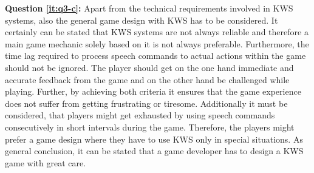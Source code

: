 \textbf{Question \ref{it:q3-c}:}
Apart from the technical requirements involved in KWS systems, also the general game design with KWS has to be considered.
It certainly can be stated that KWS systems are not always reliable and therefore a main game mechanic solely based on it is not always preferable.
Furthermore, the time lag required to process speech commands to actual actions within the game should not be ignored.
The player should get on the one hand immediate and accurate feedback from the game and on the other hand be challenged while playing.
Further, by achieving both criteria it ensures that the game experience does not suffer from getting frustrating or tiresome.
Additionally it must be considered, that players might get exhausted by using speech commands consecutively in short intervals during the game.
Therefore, the players might prefer a game design where they have to use KWS only in special situations.
As general conclusion, it can be stated that a game developer has to design a KWS game with great care.